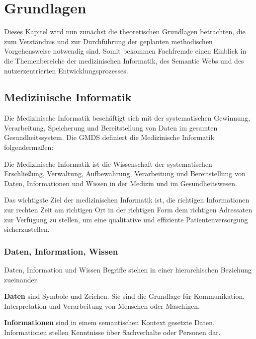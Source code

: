 \chapter{Grundlagen}\label{ch:preliminaries}

Dieses Kapitel wird nun zunächst die theoretischen Grundlagen betrachten, die zum Verständnis und zur Durchführung der geplanten methodischen Vorgehensweise notwendig sind.
Somit bekommen Fachfremde einen Einblick in die Themenbereiche der medizinischen Informatik, des Semantic Webs und des nutzerzentrierten Entwicklungsprozesses.

\section{Medizinische Informatik}\label{sec:mi}

Die Medizinische Informatik beschäftigt sich mit der systematischen Gewinnung, Verarbeitung, Speicherung und Bereitstellung von Daten im gesamten Gesundheitssystem. 
Die \ac{GMDS} definiert die Medizinische Informatik folgendermaßen:

\begin{definition}
	Die Medizinische Informatik ist die Wissenschaft der systematischen Erschließung, Verwaltung, Aufbewahrung, Verarbeitung und Bereitstellung von Daten, Informationen und 	Wissen in der Medizin und im Gesundheitswesen.
\end{definition}

Das wichtigste Ziel der medizinischen Informatik ist, die richtigen Informationen zur rechten Zeit am richtigen Ort in der richtigen Form dem richtigen Adressaten zur Verfügung zu stellen, um eine qualitative und effiziente Patientenversorgung sicherzustellen. \citep[vgl.]{winter_health_2011}

\subsection{Daten, Information, Wissen}

Daten, Information und Wissen Begriffe stehen in einer hierarchischen Beziehung zueinander.

\textbf{Daten} sind Symbole und Zeichen. Sie sind die Grundlage für Kommunikation, Interpretation und Verarbeitung von Menschen oder Maschinen.

\textbf{Informationen} sind in einem semantischen Kontext gesetzte Daten.
Informationen stellen Kenntnisse über Sachverhalte oder Personen dar.

